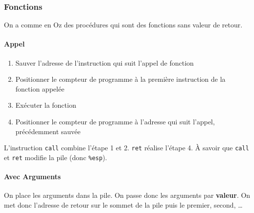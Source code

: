 \subsubsection{Fonctions}\label{fonctions}

On a comme en Oz des procédures qui sont des fonctions sans valeur de
retour.

\paragraph{Appel}\label{appel}

\begin{enumerate}
\def\labelenumi{\arabic{enumi}.}
\tightlist
\item
  Sauver l'adresse de l'instruction qui suit l'appel de fonction
\item
  Positionner le compteur de programme à la première instruction de la
  fonction appelée
\item
  Exécuter la fonction
\item
  Positionner le compteur de programme à l'adresse qui suit l'appel,
  précédemment sauvée
\end{enumerate}

L'instruction \texttt{call} combine l'étape 1 et 2. \texttt{ret} réalise
l'étape 4. À savoir que \texttt{call} et \texttt{ret} modifie la pile
(donc \texttt{\%esp}).

\begin{Shaded}
\begin{Highlighting}[]
\end{Highlighting}
\end{Shaded}

\paragraph{Avec Arguments}\label{avec-arguments}

On place les arguments dans la pile. On passe donc les arguments par
\textbf{valeur}. On met donc l'adresse de retour sur le sommet de la
pile puis le premier, second, \ldots{}


